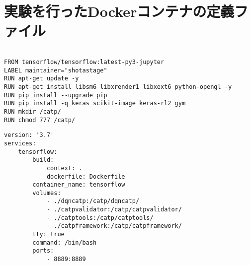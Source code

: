    

\section{実験を行ったDockerコンテナの定義ファイル}


\begin{lstlisting}[caption = Dockerfileの定義, label = program1]

FROM tensorflow/tensorflow:latest-py3-jupyter
LABEL maintainer="shotastage"
RUN apt-get update -y
RUN apt-get install libsm6 libxrender1 libxext6 python-opengl -y
RUN pip install --upgrade pip
RUN pip install -q keras scikit-image keras-rl2 gym
RUN mkdir /catp/
RUN chmod 777 /catp/
\end{lstlisting}



\begin{lstlisting}[caption = docker-compose.ymlの定義, label = program1]
version: '3.7'
services:
    tensorflow:
        build:
            context: .
            dockerfile: Dockerfile
        container_name: tensorflow
        volumes:
            - ./dqncatp:/catp/dqncatp/
            - ./catpvalidator:/catp/catpvalidator/
            - ./catptools:/catp/catptools/
            - ./catpframework:/catp/catpframework/
        tty: true
        command: /bin/bash
        ports:
            - 8889:8889
    
\end{lstlisting}
    

